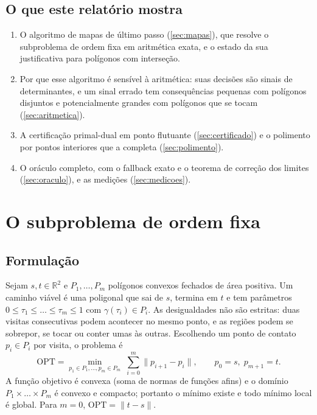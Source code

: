 \documentclass[11pt,a4paper]{article}
\theoremstyle{plain}\newtheorem{proposicao}{Proposição}
\theoremstyle{definition}\newtheorem{definicao}{Definição}
\theoremstyle{plain}\newtheorem{teorema}{Teorema}
\newcommand{\R}{\mathbb R}
\newcommand{\norm}[1]{\lVert#1\rVert}
\newcommand{\OPT}{\mathrm{OPT}}
\begin{document}
\subsection{O que este relatório mostra}
\begin{enumerate}[leftmargin=*,itemsep=2pt]
\item O algoritmo de mapas de último passo (\cref{sec:mapas}), que resolve o subproblema de ordem fixa em aritmética exata, e o estado da sua justificativa para polígonos com interseção.
\item Por que esse algoritmo é sensível à aritmética: suas decisões são sinais de determinantes, e um sinal errado tem consequências pequenas com polígonos disjuntos e potencialmente grandes com polígonos que se tocam (\cref{sec:aritmetica}).
\item A certificação primal-dual em ponto flutuante (\cref{sec:certificado}) e o polimento por pontos interiores que a completa (\cref{sec:polimento}).
\item O oráculo completo, com o fallback exato e o teorema de correção dos limites (\cref{sec:oraculo}), e as medições (\cref{sec:medicoes}).
\end{enumerate}

\section{O subproblema de ordem fixa}\label{sec:subproblema}

\subsection{Formulação}
Sejam \(s,t\in\R^2\) e \(P_1,\dots,P_m\) polígonos convexos fechados de área positiva. Um caminho viável é uma poligonal que sai de \(s\), termina em \(t\) e tem parâmetros \(0\le\tau_1\le\dots\le\tau_m\le1\) com \(\gamma(\tau_i)\in P_i\). As desigualdades não são estritas: duas visitas consecutivas podem acontecer no mesmo ponto, e as regiões podem se sobrepor, se tocar ou conter umas às outras. Escolhendo um ponto de contato \(p_i\in P_i\) por visita, o problema é
\begin{equation}\label{eq:primal}
\OPT=\min_{p_1\in P_1,\dots,p_m\in P_m}\;\sum_{i=0}^{m}\norm{p_{i+1}-p_i},\qquad p_0=s,\;p_{m+1}=t.
\end{equation}
A função objetivo é convexa (soma de normas de funções afins) e o domínio \(P_1\times\dots\times P_m\) é convexo e compacto; portanto o mínimo existe e todo mínimo local é global. Para \(m=0\), \(\OPT=\norm{t-s}\).
\end{document}
